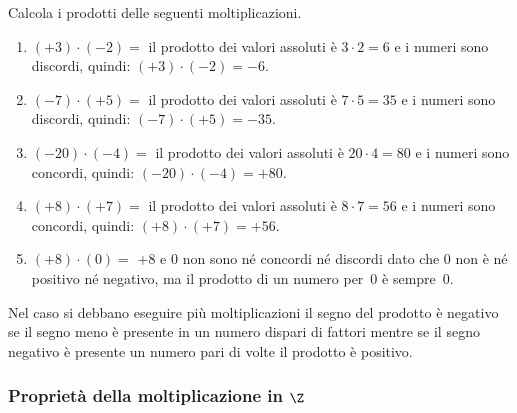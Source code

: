\begin{esempio}{}{}
Calcola i prodotti delle seguenti moltiplicazioni.
\begin{enumerate}[noitemsep, label=(\alph*)]
\item \((+3) \cdot (-2)=\) 
il prodotto dei valori assoluti è \(3 \cdot 2 = 6\) 
e i numeri sono discordi, quindi: \((+3) \cdot (-2) = -6\).
\item \((-7) \cdot (+5) =\) 
il prodotto dei valori assoluti è \(7 \cdot 5 = 35\) 
e i numeri sono discordi, quindi: \((-7) \cdot (+5) = -35\).
\item \((-20) \cdot (-4) =\) 
il prodotto dei valori assoluti è \(20 \cdot 4 = 80\) 
e i numeri sono concordi, quindi: \((-20) \cdot (-4) = +80\).
\item \((+8) \cdot (+7) =\) 
il prodotto dei valori assoluti è \(8 \cdot 7 = 56\) 
e i numeri sono concordi, quindi: \((+8) \cdot (+7) = +56\).
\item \((+8) \cdot (0) =\) 
\(+8\) e  \(0\) non sono né concordi né discordi dato che 0 non è né 
positivo né negativo, ma il prodotto di un numero per~0 è sempre~0.
\end{enumerate}
\end{esempio}

{}

Nel caso si debbano eseguire più moltiplicazioni il segno del prodotto è 
negativo se il segno meno è presente in un numero dispari di fattori 
mentre se il segno negativo è presente un numero pari di volte il prodotto 
è positivo.

\subsubsection{Proprietà della moltiplicazione in \texorpdfstring{$\Z$}{Z}}

